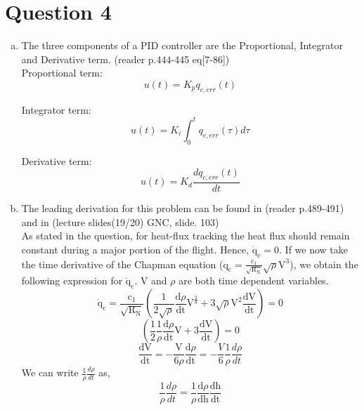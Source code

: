 \section{ Question 4 }\label{sec:q4}    
\begin{enumerate}[a.]
\item
The three components of a PID controller are the Proportional, Integrator and Derivative term. (reader p.444-445 eq[7-86])\\
Proportional term: 
\begin{equation}
u(t)=K_{p} q_{c,err}(t)
\end{equation}

Integrator term: 
\begin{equation}
u(t)=K_{i} \int_{0}^{t} q_{c,err}(\tau) d \tau
\end{equation}

Derivative term: 
\begin{equation}
u(t)=K_{d} \frac{d q_{c,err}(t)}{d t}
\end{equation}

\item
The leading derivation for this problem can be found in (reader p.489-491) and in (lecture slides(19/20) GNC, slide. 103)\\
As stated in the question, for heat-flux tracking the heat flux should remain constant during a major portion of the flight. Hence, $\dot{\mathrm{q}}_{\mathrm{c}}=0$. If we now take the time derivative of the Chapman equation ($\mathrm{q}_{\mathrm{c}}=\frac{\mathrm{c}_{1}}{\sqrt{\mathrm{R}_{\mathrm{N}}}} \sqrt{\rho} \mathrm{V}^{3}$), we obtain the following expression for $\dot{\mathrm{q}}_{\mathrm{c}}$. V and $\rho$ are both time dependent variables.
\begin{equation}
\dot{\mathrm{q}}_{\mathrm{c}}=\frac{\mathrm{c}_{1}}{\sqrt{\mathrm{R}_{\mathrm{N}}}}\left(\frac{1}{2 \sqrt{\rho}} \frac{\mathrm{d} \rho}{\mathrm{dt}} \mathrm{V}^{\frac{2}{8}}+3 \sqrt{\rho} \mathrm{V}^{2} \frac{\mathrm{d} \mathrm{V}}{\mathrm{dt}}\right)=0
\end{equation}
\begin{equation}
\left(\frac{1}{2} \frac{1}{\rho} \frac{\mathrm{d} \rho}{\mathrm{dt}} \mathrm{V}+3 \frac{\mathrm{d} \mathrm{V}}{\mathrm{dt}}\right)=0
\end{equation}
\begin{equation}
\frac{\mathrm{dV}}{\mathrm{dt}}=-\frac{\mathrm{V}}{6 \rho}\frac{\mathrm{d} \rho}{\mathrm{dt}} = -\frac{V}{6} \frac{1}{\rho} \frac{d \rho}{d t}
\label{eq:dVdt}
\end{equation}
We can write $\frac{1}{\rho} \frac{d \rho}{d t}$ as,
\begin{equation}
\frac{1}{\rho} \frac{d \rho}{d t} = \frac{1}{\rho} \frac{\mathrm{d} \rho}{\mathrm{dh}} \frac{\mathrm{dh}}{\mathrm{dt}}
\label{eq:drhodt}
\end{equation}


\end{enumerate}
